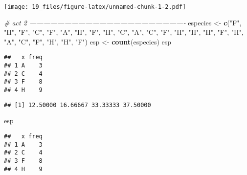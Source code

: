 \documentclass[
]{article}
\newenvironment{Shaded}{\begin{snugshade}}{\end{snugshade}}
\newcommand{\CommentTok}[1]{\textcolor[rgb]{0.56,0.35,0.01}{\textit{#1}}}
\newcommand{\DecValTok}[1]{\textcolor[rgb]{0.00,0.00,0.81}{#1}}
\newcommand{\KeywordTok}[1]{\textcolor[rgb]{0.13,0.29,0.53}{\textbf{#1}}}
\newcommand{\NormalTok}[1]{#1}
\newcommand{\OperatorTok}[1]{\textcolor[rgb]{0.81,0.36,0.00}{\textbf{#1}}}
\newcommand{\StringTok}[1]{\textcolor[rgb]{0.31,0.60,0.02}{#1}}
\begin{document}
\texttt{[image: 19\_files/figure-latex/unnamed-chunk-1-2.pdf]}

\begin{Shaded}
\begin{Highlighting}[]
\CommentTok{# act 2 -------------------------------------------------------------------}
\NormalTok{especies <-}\StringTok{ }\KeywordTok{c}\NormalTok{(}\StringTok{"F"}\NormalTok{, }\StringTok{"H"}\NormalTok{, }\StringTok{"F"}\NormalTok{, }\StringTok{"C"}\NormalTok{, }\StringTok{"F"}\NormalTok{, }\StringTok{"A"}\NormalTok{, }\StringTok{"H"}\NormalTok{, }\StringTok{"F"}\NormalTok{,}
              \StringTok{"H"}\NormalTok{, }\StringTok{"C"}\NormalTok{, }\StringTok{"A"}\NormalTok{, }\StringTok{"C"}\NormalTok{, }\StringTok{"F"}\NormalTok{, }\StringTok{"H"}\NormalTok{, }\StringTok{"H"}\NormalTok{, }\StringTok{"H"}\NormalTok{,}
              \StringTok{"F"}\NormalTok{, }\StringTok{"H"}\NormalTok{, }\StringTok{"A"}\NormalTok{, }\StringTok{"C"}\NormalTok{, }\StringTok{"F"}\NormalTok{, }\StringTok{"H"}\NormalTok{, }\StringTok{"H"}\NormalTok{, }\StringTok{"F"}\NormalTok{)}
\NormalTok{esp <-}\StringTok{ }\KeywordTok{count}\NormalTok{(especies)}
\NormalTok{esp}
\end{Highlighting}
\end{Shaded}

\begin{verbatim}
##   x freq
## 1 A    3
## 2 C    4
## 3 F    8
## 4 H    9
\end{verbatim}

\begin{Shaded}
\end{Shaded}

\begin{verbatim}
## [1] 12.50000 16.66667 33.33333 37.50000
\end{verbatim}

\begin{Shaded}
\begin{Highlighting}[]
\NormalTok{esp}
\end{Highlighting}
\end{Shaded}

\begin{verbatim}
##   x freq
## 1 A    3
## 2 C    4
## 3 F    8
## 4 H    9
\end{verbatim}
\end{document}
